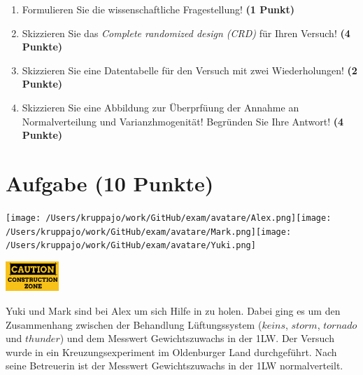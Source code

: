 \documentclass[a4paper, 9pt]{scrartcl}\usepackage[]{graphicx}\usepackage[]{xcolor}
\begin{document}
\begin{enumerate}
  \setcounter{enumi}{0}
  \item Formulieren Sie die wissenschaftliche Fragestellung! \textbf{(1 Punkt)}
  \item Skizzieren Sie das \textit{Complete randomized design (CRD)} für Ihren Versuch! \textbf{(4 Punkte)}
  \item Skizzieren Sie eine Datentabelle für den Versuch mit zwei Wiederholungen! \textbf{(2 Punkte)}
  \item Skizzieren Sie eine Abbildung zur Überprfüung der Annahme an Normalverteilung und Varianzhmogenität! Begründen Sie Ihre Antwort! \textbf{(4 Punkte)}
\end{enumerate}


 
\clearpage

\section{Aufgabe \hfill (10 Punkte)}


 
\begin{minipage}[t]{0.5\textwidth}
\texttt{[image: /Users/kruppajo/work/GitHub/exam/avatare/Alex.png]}\hspace{-4mm}\texttt{[image: /Users/kruppajo/work/GitHub/exam/avatare/Mark.png]}\hspace{-4mm}\texttt{[image: /Users/kruppajo/work/GitHub/exam/avatare/Yuki.png]}
\end{minipage}
\begin{minipage}[t]{0.5\textwidth}
\hfill
\href{https://youtu.be/wJqsNV1hOW8}{\includegraphics[width = 2cm]{img/caution}}
\end{minipage}
\vspace{1ex}



Yuki und Mark sind bei Alex um sich Hilfe in \Rlogo zu holen. Dabei ging es um den Zusammenhang zwischen der Behandlung Lüftungssystem ($keins$, $storm$, $tornado$ und $thunder$) und dem Messwert Gewichtszuwachs in der 1LW. Der Versuch wurde in ein Kreuzungsexperiment im Oldenburger Land durchgeführt. Nach seine Betreuerin ist der Messwert Gewichtszuwachs in der 1LW normalverteilt.
\end{document}
